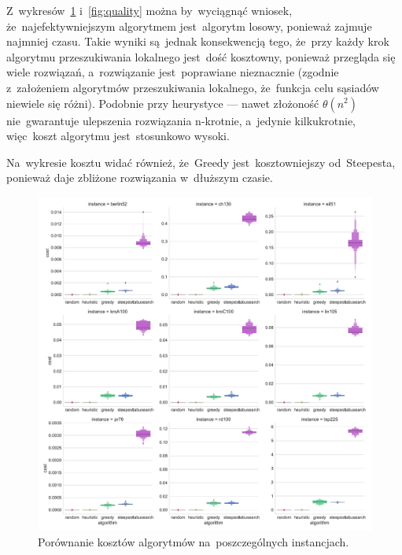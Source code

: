 Z~wykresów~\ref{fig:cost} i~\ref{fig:quality} można by~wyciągnąć wniosek, że~najefektywniejszym algorytmem jest~algorytm losowy, ponieważ zajmuje najmniej czasu. Takie wyniki są~jednak konsekwencją tego, że~przy każdy krok algorytmu przeszukiwania lokalnego jest~dość kosztowny, ponieważ przegląda się wiele rozwiązań, a~rozwiązanie jest~poprawiane nieznacznie (zgodnie z~założeniem algorytmów przeszukiwania lokalnego, że~funkcja celu sąsiadów niewiele się różni). Podobnie przy heurystyce --- nawet złożoność $\theta(n^2)$ nie~gwarantuje ulepszenia rozwiązania n-krotnie, a~jedynie kilkukrotnie, więc~koszt algorytmu jest~stosunkowo wysoki.

Na~wykresie kosztu widać również, że~Greedy jest~kosztowniejszy od~Steepesta, ponieważ daje zbliżone rozwiązania w~dłuższym czasie.

\begin{figure}[H]
\begin{center}
\includegraphics[width=1.0\textwidth]{graphs/cost_comparison_letval.pdf}
\end{center}
\caption{Porównanie kosztów algorytmów na~poszczególnych instancjach.}
\label{fig:cost}
\end{figure}

